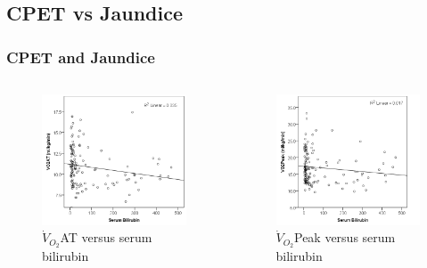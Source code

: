 \documentclass{beamer}
\begin{document}
\subsection{CPET vs Jaundice}
\begin{frame}
	\frametitle{CPET and Jaundice}
	\begin{columns}[t]
			\begin{figure}
				\centering
				\includegraphics[width=\textwidth]{../Figures/cpet_oj_scatter_at_bil}
				\caption{$\dot{V}_{O_2}$AT versus serum bilirubin}
				\label{fig:cpet_oj_scatter_at_bil}
			\end{figure}
			
			\begin{figure}
				\includegraphics[width=\textwidth]{../Figures/cpet_oj_scatter_peak_bil}
				\caption{$\dot{V}_{O_2}$Peak versus serum bilirubin}
				\label{fig:cpet_oj_scatter_peak_bil}
			\end{figure}
	\end{columns}
	

\end{frame}
\end{document}
